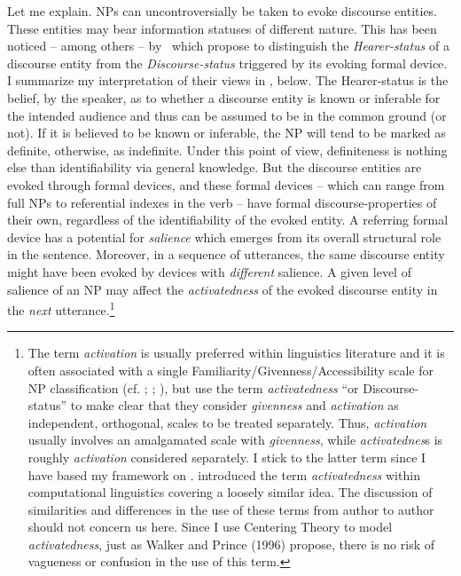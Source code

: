 \documentclass[output=paper
,modfonts
,nonflat]{langsci/langscibook}
\begin{document}
Let me explain. NPs can uncontroversially be taken to evoke discourse entities. These entities may bear information statuses of different nature. This has been noticed -- among others -- by~\citet[291--294]{WalkerPrince1996} which propose to distinguish the \textit{Hearer-status} of a discourse entity from the \textit{Discourse-status} triggered by its evoking formal device. I summarize my interpretation of their views in , below. The Hearer-status is the belief, by the speaker, as to whether a discourse entity is known or inferable for the intended audience and thus can be assumed to be in the common ground (or not). If it is believed to be known or inferable, the NP will tend to be marked as definite, otherwise, as indefinite. Under this point of view, definiteness is nothing else than identifiability via general knowledge. But the discourse entities are evoked through formal devices, and these formal devices -- which can range from full NPs to referential indexes in the verb -- have formal discourse-properties of their own, regardless of the identifiability of the evoked entity. A referring formal device has a potential for \textit{salience} which emerges from its overall structural role in the sentence. Moreover, in a sequence of utterances, the same discourse entity might have been evoked by devices with \textit{different} salience. A given level of salience of an NP may affect the \textit{activatedness} of the evoked discourse entity in the \textit{next} utterance.\footnote{The term \textit{activation} is usually preferred within linguistics literature and it is often associated with a single Familiarity/Givenness/Accessibility scale for NP classification (cf. \citealt{Ariel1990}; \citealt{GundelEtAlii1993}; \citealt{Kibrik2011}), but \citet[294]{WalkerPrince1996} use the term \textit{activatedness} “or Discourse-status” to make clear that they consider \textit{givenness} and \textit{activation} as independent, orthogonal, scales to be treated separately. Thus, \textit{activation} usually involves an amalgamated scale with \textit{givenness}, while \textit{activatednes}s is roughly \textit{activation} considered separately. I stick to the latter term since I have based my framework on \citet{WalkerPrince1996}. \citet{Kantor1977} introduced the term \textit{activatedness} within computational linguistics covering a loosely similar idea. The discussion of similarities and differences in the use of these terms from author to author should not concern us here. Since I use Centering Theory to model \textit{activatedness}, just as Walker and Prince (1996) propose, there is no risk of vagueness or confusion in the use of this term.}\pagebreak
\end{document}
